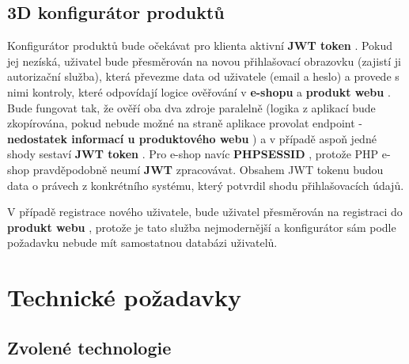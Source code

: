 \documentclass[a4paper,12pt]{article}
\begin{document}
\subsection{3D konfigurátor produktů}

Konfigurátor produktů bude očekávat pro klienta aktivní \textbf{JWT token}
. Pokud jej nezíská, uživatel bude přesměrován na novou přihlašovací obrazovku (zajistí ji autorizační služba), která převezme data od uživatele (email a heslo) a provede s nimi kontroly, které odpovídají logice ověřování v \textbf{e-shopu}
 a \textbf{produkt webu}
. Bude fungovat tak, že ověří oba dva zdroje paralelně (logika z aplikací bude zkopírována, pokud nebude možné na straně aplikace provolat endpoint - \textbf{nedostatek informací u produktového webu}
) a v případě aspoň jedné shody sestaví \textbf{JWT token}
. Pro e-shop navíc \textbf{PHPSESSID}
, protože PHP e-shop pravděpodobně neumí \textbf{JWT}
 zpracovávat. Obsahem JWT tokenu budou data o právech z konkrétního systému, který potvrdil shodu přihlašovacích údajů.\par

V případě registrace nového uživatele, bude uživatel přesměrován na registraci do \textbf{produkt webu}
, protože je tato služba nejmodernější a konfigurátor sám podle požadavku nebude mít samostatnou databázi uživatelů.\par

\section{Technické požadavky}

\subsection{Zvolené technologie}
\end{document}
